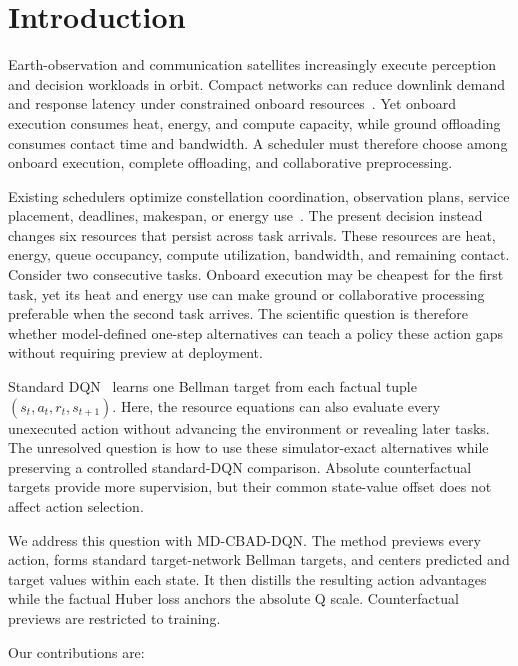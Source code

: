 \documentclass[11pt]{article}
\newcommand{\method}{MD-CBAD-DQN\xspace}
\begin{document}
\section{Introduction}

Earth-observation and communication satellites increasingly execute perception and decision workloads in orbit. Compact networks can reduce downlink demand and response latency under constrained onboard resources~\cite{9925218,10107454,10378728,10440355,10423050}. Yet onboard execution consumes heat, energy, and compute capacity, while ground offloading consumes contact time and bandwidth. A scheduler must therefore choose among onboard execution, complete offloading, and collaborative preprocessing.

{\color{red}%
Existing schedulers optimize constellation coordination, observation plans, service placement, deadlines, makespan, or energy use~\cite{RN8,RN10,RN20,RN22,RN23,RN27,RN28}. The present decision instead changes six resources that persist across task arrivals. These resources are heat, energy, queue occupancy, compute utilization, bandwidth, and remaining contact. Consider two consecutive tasks. Onboard execution may be cheapest for the first task, yet its heat and energy use can make ground or collaborative processing preferable when the second task arrives. The scientific question is therefore whether model-defined one-step alternatives can teach a policy these action gaps without requiring preview at deployment.
}%

Standard DQN~\cite{mnih2015human,watkins1992q} learns one Bellman target from each factual tuple $(s_t,a_t,r_t,s_{t+1})$. Here, the resource equations can also evaluate every unexecuted action without advancing the environment or revealing later tasks. The unresolved question is how to use these simulator-exact alternatives while preserving a controlled standard-DQN comparison. Absolute counterfactual targets provide more supervision, but their common state-value offset does not affect action selection.

We address this question with \method. The method previews every action, forms standard target-network Bellman targets, and centers predicted and target values within each state. It then distills the resulting action advantages while the factual Huber loss anchors the absolute Q scale. Counterfactual previews are restricted to training.

Our contributions are:
\end{document}
